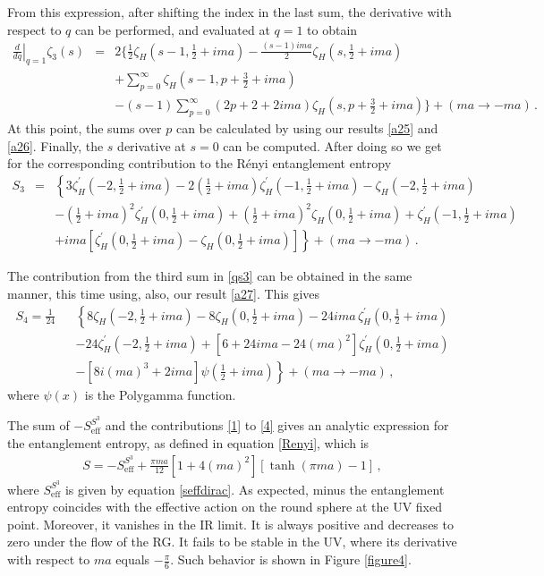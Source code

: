 \documentclass[12pt,a4paper]{article}
\newcommand{\beq}{\begin{eqnarray}}
\newcommand{\eeq}{\end{eqnarray}}
\newcommand{\nn}{\nonumber}
\numberwithin{equation}{section}
\begin{document}
From this expression, after shifting the index in the last sum, the derivative with respect to $q$ can be performed, and evaluated at $q=1$ to obtain
%
\beq \left.\frac{d}{dq}\right\vert_{q=1}{\zeta_3}(s)&=&2\Bigg\{\frac12 {\zeta}_H \left(s-1,\frac{1}{2}+ima\right)-\frac{(s-1)i ma}{2}{\zeta}_H \left(s,\frac{1}{2}+ima\right)\nn\\
&&+\sum_{p=0}^{\infty}{\zeta}_H \left(s-1,p+\frac{3}{2}+ima\right)\nn \\ \nn
&& -(s-1)\sum_{p=0}^{\infty}(2p+2+2i ma){\zeta}_H \left(s,p+\frac{3}{2}+ima\right)\Bigg\}+(ma\rightarrow -ma)\,.\eeq
%
At this point, the sums over $p$ can be calculated by using our results \eqref{a25} and \eqref{a26}. Finally, the $s$ derivative at $s=0$ can be computed. After doing so we get for the corresponding contribution to the R\'enyi entanglement entropy
\beq
S_3&=&\left\{3{\zeta}^{\prime}_H \left(-2,\frac{1}{2}+ima\right)-2\left(\frac12+i ma\right) {\zeta}^{\prime}_H \left(-1,\frac{1}{2}+ima\right)-{\zeta}_H \left(-2,\frac{1}{2}+ima\right)\right.\nn  \\
&& -\left(\frac12+i ma\right)^2 {\zeta}^{\prime}_H \left(0,\frac{1}{2}+ima\right)+{\left(\frac12+i ma\right)}^2 {\zeta}_H \left(0,\frac{1}{2}+ima\right)+{\zeta}^{\prime}_H \left(-1,\frac{1}{2}+ima\right)\nn  \\
&& +\left. i ma \left[{\zeta}^{\prime}_H \left(0,\frac{1}{2}+ima\right)-{\zeta}_H \left(0,\frac{1}{2}+ima\right)\right]\right\}+(ma\rightarrow -ma)\,.\label{3}\eeq

The contribution from the third sum in \eqref{qs3}  can be obtained in the same manner, this time using, also, our result \eqref{a27}. This gives
\beq S_4=\frac{1}{24} &&\!\!\!\! \left\{8{\zeta}_H \left(-2,\frac{1}{2}+ima\right)-8{\zeta}_H \left(0,\frac{1}{2}+ima\right)-24 i ma\, {\zeta}^{\prime}_H \left(0,\frac{1}{2}+ima\right)\right.\nn \\
&& -24{\zeta}^{\prime}_H \left(-2,\frac{1}{2}+ima\right)+\left[6+24i ma-24(ma)^2\right]{\zeta}^{\prime}_H \left(0,\frac{1}{2}+ima\right)\nn \\
&& -\left.\left[8i (ma)^3 +2ima\right]\psi\left(\frac12+i ma\right)\right\}+(ma\rightarrow -ma)\,, \label{4}\eeq
where $\psi(x)$ is the Polygamma function.

The sum of $-S_{\mathrm{eff}}^{S^3}$ and the contributions \eqref{1} to \eqref{4} gives an analytic expression for the entanglement entropy, as defined in equation \eqref{Renyi}, which is
\beq
S=-S_{\mathrm{eff}}^{S^3}+\frac{\pi ma}{12}\left[1+4(ma)^2\right]\left[\tanh{(\pi ma)}-1\right]\,,
\label{renyidirac}\eeq
where $S_{\mathrm{eff}}^{S^3}$ is given by equation \eqref{seffdirac}. As expected, minus the entanglement entropy coincides with the effective action on the round sphere at the UV fixed point. Moreover, it vanishes in the IR limit. It is always positive and decreases to zero under the flow of the RG. It fails to be stable in the UV, where its derivative with respect to $ma$ equals $-\frac{\pi}{6}$. Such behavior is shown in Figure \ref{figure4}.
\end{document}
